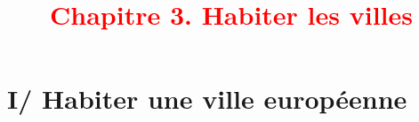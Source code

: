 \documentclass{beamer}
\begin{document}
\begin{frame}
 \titlepage %
 \end{frame}
 
 \begin{frame}
 \tableofcontents
 \end{frame}
      \title{{\textcolor{red}{Chapitre 3. Habiter les villes}}}
      
   
   
   



\section{I/ Habiter une ville européenne}
\end{document}
